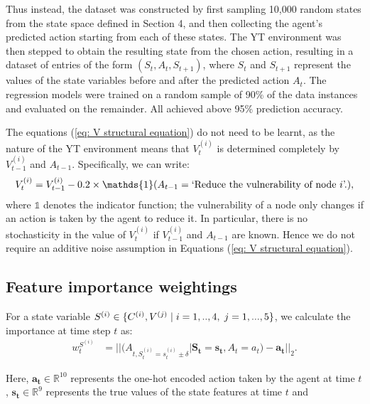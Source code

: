 \documentclass{article}
\begin{document}
Thus instead, the dataset was constructed by first sampling 10,000 random states from the state space defined in Section 4, and then collecting the agent's predicted action starting from each of these states. The YT environment was then stepped to obtain the resulting state from the chosen action, resulting in a dataset of entries of the form $(S_t, A_t, S_{t+1})$, where $S_t$ and $S_{t+1}$ represent the values of the state variables before and after the predicted action $A_t$. The regression models were trained on a random sample of 90\% of the data instances and evaluated on the remainder. All achieved above 95\% prediction accuracy. 


The equations (\ref{eq: V structural equation}) do not need to be learnt, as the nature of the YT environment means that $V_t^{(i)}$ is determined completely by $V_{t-1}^{(i)}$ and $A_{t-1}$. Specifically, we can write:
\begin{align}
    V_t^{(i)} = V_{t-1}^{(i)} - 0.2 \times \mathds{1}(A_{t-1} = \textnormal{`Reduce the vulnerability of node } i \textnormal{'.}),
\end{align}
\noindent where $\mathds{1}$ denotes the indicator function; the vulnerability of a node only changes if an action is taken by the agent to reduce it. In particular, there is no stochasticity in the value of $V_t^{(i)}$ if $V_{t-1}^{(i)}$ and $A_{t-1}$ are known. Hence we do not require an additive noise assumption in Equations (\ref{eq: V structural equation}).


\subsection{Feature importance weightings}

For a state variable $S^{(i)} \in \{C^{(i)}, V^{(j)} \hspace{1mm}| \hspace{1mm}i = 1,..,4,\hspace{1mm} j = 1,...,5\}$, we calculate the importance at time step $t$ as:
\begin{align}
\label{eq: feature importance}
    w^{S^{(i)}}_t &= || (A_{t, S^{(i)}_t = s_t^{(i)} \pm \delta} | \mathbf{S_t = s_t}, A_t = a_t) - \mathbf{a_t} ||_2.
\end{align}

\noindent Here, $\mathbf{a_t} \in \mathbb{R}^{10}$ represents the one-hot encoded action taken by the agent at time $t$, $\mathbf{s_t} \in \mathbb{R}^{9}$ represents the true values of the state features at time $t$ and 
\end{document}
